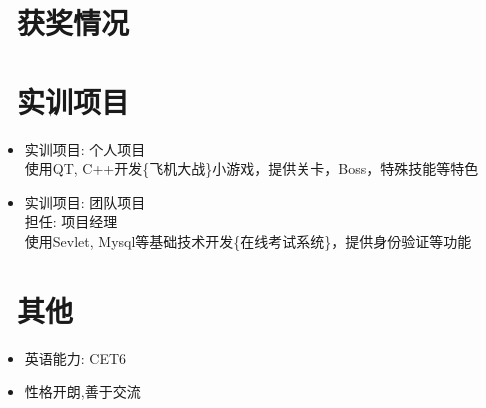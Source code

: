 \documentclass{resume}
\begin{document}
\section{\faHeartO\ 获奖情况}

\section{\faUsers\ 实训项目}
\begin{itemize}[parsep=0.5ex]
  \item 实训项目: 个人项目 \\
  使用QT, C++开发\{飞机大战\}小游戏，提供关卡，Boss，特殊技能等特色
  \item 实训项目: 团队项目 \\
  担任: 项目经理 \\
  使用Sevlet, Mysql等基础技术开发\{在线考试系统\}，提供身份验证等功能
\end{itemize}

\section{\faInfo\ 其他}
\begin{itemize}[parsep=0.5ex]
  \item 英语能力: CET6
  \item 性格开朗,善于交流
\end{itemize}
\end{document}
